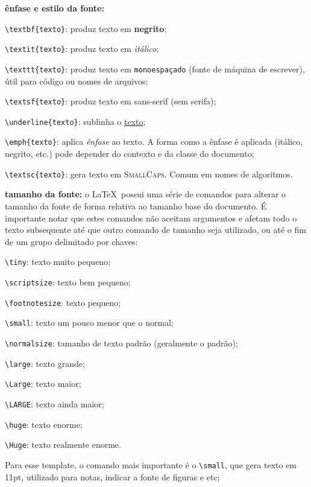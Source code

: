 \begin{alineas}
	\item \textbf{ênfase e estilo da fonte:}
	\begin{alineas}
		\item \verb|\textbf{texto}|: produz texto em \textbf{negrito};
		\item \verb|\textit{texto}|: produz texto em \textit{itálico};
		\item \verb|\texttt{texto}|: produz texto em \texttt{monoespaçado} (fonte de máquina de escrever), útil para código ou nomes de arquivos;
		\item \verb|\textsf{texto}|: produz texto em \textsf{sans-serif} (sem serifa);
		\item \verb|\underline{texto}|: sublinha o \underline{texto};
		\item \verb|\emph{texto}|: aplica \emph{ênfase} ao texto. A forma como a ênfase é aplicada (itálico, negrito, etc.) pode depender do contexto e da classe do documento;
		\item \verb|\textsc{texto}|: gera texto em \textsc{SmallCaps}. Comum em nomes de algoritmos.
	\end{alineas}
	
	\item \textbf{tamanho da fonte:} o \LaTeX\  possui uma série de comandos para alterar o tamanho da fonte de forma relativa ao tamanho base do documento. É importante notar que estes comandos não aceitam argumentos e afetam todo o texto subsequente até que outro comando de tamanho seja utilizado, ou até o fim de um grupo delimitado por chaves:
	\begin{alineas}
		\item \verb|\tiny|: {\tiny texto muito pequeno;}
		\item \verb|\scriptsize|: {\scriptsize texto bem pequeno;}
		\item \verb|\footnotesize|: {\footnotesize texto pequeno;}
		\item \verb|\small|: {\small texto um pouco menor que o normal;}
		\item \verb|\normalsize|: {\normalsize tamanho de texto padrão (geralmente o padrão);}
		\item \verb|\large|: {\large texto grande;}
		\item \verb|\Large|: {\Large texto maior;}
		\item \verb|\LARGE|: {\LARGE texto ainda maior;}
		\item \verb|\huge|: {\huge texto enorme;}
		\item \verb|\Huge|: {\Huge texto realmente enorme.}
	\end{alineas}
	Para esse template, o comando mais importante é o \verb|\small|, que gera texto em 11pt, utilizado para notas, indicar a fonte de figuras e etc;
	

\end{alineas}
